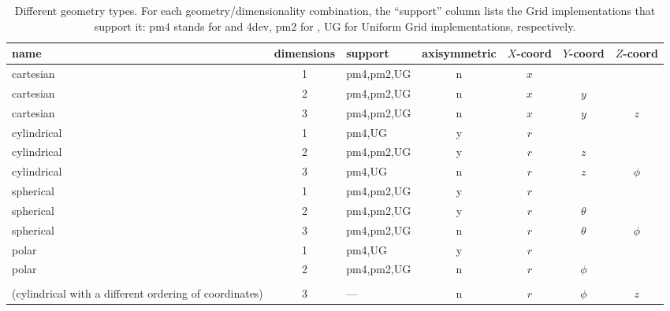 \begin{table}[ht]

\caption{Different geometry types.
For each geometry/dimensionality combination,
the ``support'' column lists the \unit{Grid} implementations
that support it: pm4 stands for  and \Paramesh4dev, pm2 for , UG for
Uniform Grid implementations, respectively.
}
\label{Tab:geometries} 
\begin{center}
\begin{tabular}{lclcccc}
name       & dimensions & support  & axisymmetric & $X$-coord & $Y$-coord & $Z$-coord \\
\hline
cartesian   &    1       & pm4,pm2,UG & n            & $x$         &             &      \\
cartesian   &    2       & pm4,pm2,UG & n            & $x$         & $y$         &      \\
cartesian   &    3       & pm4,pm2,UG & n            & $x$         & $y$         & $z$  \\
\hline
cylindrical &    1       & pm4,UG   &   y            & $r$         &             &      \\
cylindrical &    2       & pm4,pm2,UG & y            & $r$         & $z$         &      \\
cylindrical &    3       & pm4,UG   &   n            & $r$         & $z$         & $\phi$ \\\hline
spherical   &    1       & pm4,pm2,UG & y            & $r$         &             &      \\
spherical   &    2       & pm4,pm2,UG & y            & $r$         & $\theta$    &      \\
spherical   &    3       & pm4,pm2,UG & n            & $r$         & $\theta$    & $\phi$ \\\hline
polar       &    1       & pm4,UG   &   y            & $r$         &             &      \\
polar       &    2       & pm4,pm2,UG & n            & $r$         & $\phi$      &      \\
\llap{}
\begin{minipage}{1.5in}
''polar + $z$''\\
(cylindrical with a different ordering of coordinates)
\end{minipage}
&  3       & ---      &   n            & $r$         & $\phi$      & $z$ \\
\hline
\end{tabular}
\end{center}

\end{table}
%

